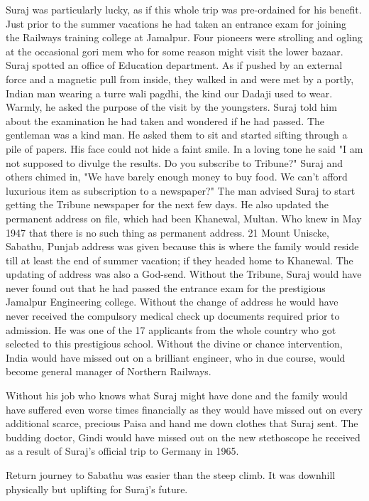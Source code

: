 Suraj was particularly lucky, as if this whole trip was pre-ordained for his benefit. Just prior to the summer vacations he had taken an entrance exam for joining the Railways training college at Jamalpur. Four pioneers were strolling and ogling at the occasional gori mem who for some reason might visit the lower bazaar. Suraj spotted an office of Education department. As if pushed by an external force and a magnetic pull from inside, they walked in and were met by a portly, Indian man wearing a turre wali pagdhi, the kind our Dadaji used to wear. Warmly, he asked the purpose of the visit by the youngsters. Suraj told him about the examination he had taken and wondered if he had passed. The gentleman was a kind man. He asked them to sit and started sifting through a pile of papers. His face could not hide a faint smile. In a loving tone he said "I am not supposed to divulge the results. Do you subscribe to Tribune?"
Suraj and others chimed in, "We have barely enough money to buy food. We can’t afford luxurious item as subscription to a newspaper?" 
The man advised Suraj to start getting the Tribune newspaper for the next few days. He also updated the permanent address on file, which had been Khanewal, Multan. Who knew in May 1947 that there is no such thing as permanent address. 21 Mount Uniscke, Sabathu, Punjab address was given because this is where the family would reside till at least the end of summer vacation; if they headed home to Khanewal. The updating of address was also a God-send. Without the Tribune, Suraj would have never found out that he had passed the entrance exam for the prestigious Jamalpur Engineering college. Without the change of address he would have never received the compulsory medical check up documents required prior to admission. He was one of the 17 applicants from the whole country who got selected to this prestigious school. Without the divine or chance intervention, India  would have missed out on a brilliant engineer, who in due course, would become general manager of Northern  Railways. 

Without his job who knows what Suraj might have done and the family would have suffered even worse times financially as they would have missed out on every additional scarce, precious Paisa and hand me down clothes that Suraj sent.  The budding doctor, Gindi would have missed out on the new stethoscope he received as a result of Suraj's official trip to Germany in 1965. 

Return journey to Sabathu was easier than the steep climb. It was downhill physically but uplifting for Suraj’s future. 

